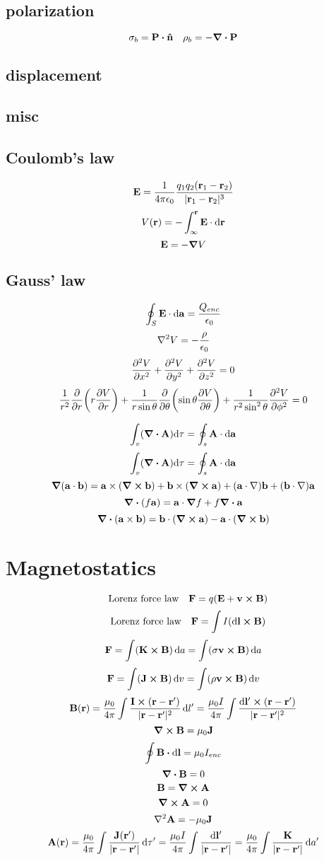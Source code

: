 \documentclass[12pt]{article}
\begin{document}
\subsection*{polarization}
\[\sigma_b=\vb{P}\vdot\vu{n}\quad\rho_b=-\div{\vb{P}}\]
\subsection*{displacement}
\subsection*{misc}

\subsection*{Coulomb's law}
\[\vb{E}=\frac{1}{4\pi\epsilon_0}\frac{q_1q_2(\vb{r}_1-\vb{r}_2)}{|\vb{r}_1-\vb{r}_2|^3}\]
\[V(\vb{r})=-\int_\infty^{\vb{r}}\vb{E}\cdot\dd\vb{r}\]
\[\vb{E}=-\grad{V}\]

\subsection*{Gauss' law}
\[\oint_S{\vb{E}\cdot\dd{\vb{a}}}=\frac{Q_{enc}}{\epsilon_0}\]
\[\laplacian{V}=-\frac{\rho}{\epsilon_0}\]
\[\pdv[2]{V}{x}+\pdv[2]{V}{y}+\pdv[2]{V}{z}=0\]
\[\frac{1}{r^2}\pdv{r}\qty(r\pdv{V}{r})+\frac{1}{r\sin\theta}\pdv{\theta}\qty(\sin\theta\pdv{V}{\theta})+\frac{1}{r^2\sin^2\theta}\pdv[2]{V}{\phi}=0\]

\[\int_{v}(\div{\vb{A}})\dd\tau=\oint_{s}\vb{A}\cdot\dd{\vb{a}}\]
\[\int_{v}(\div{\vb{A}})\dd\tau=\oint_{s}\vb{A}\cdot\dd{\vb{a}}\]
\[\grad{(\vb{a}\cdot\vb{b})}=\vb{a}\times(\curl{\vb{b}})+\vb{b}\times(\curl{\vb{a}})+(\vb{a}\cdot\nabla)\vb{b}+(\vb{b}\cdot\nabla)\vb{a}\]
\[\div{(f\vb{a})}=\vb{a}\cdot\grad{f}+f\div{\vb{a}}\]
\[\div{(\vb{a}\times\vb{b})}=\vb{b}\cdot(\curl{\vb{a}})-\vb{a}\cdot(\curl{\vb{b}})\]

\section{Magnetostatics}
\[\qq{Lorenz force law}\vb{F}=q(\vb{E}+\vb{v}\cp\vb{B})\]
\[\qq{Lorenz force law}\vb{F}=\int I(\dd\vb{l}\cp\vb{B})\]
\[\vb{F}=\int (\vb{K}\cp\vb{B})\dd{a}=\int (\sigma\vb{v}\cp\vb{B})\dd{a}\]
\[\vb{F}=\int (\vb{J}\cp\vb{B})\dd{v}=\int (\rho\vb{v}\cp\vb{B})\dd{v}\]
\[\vb{B}(\vb{r})=\frac{\mu_0}{4\pi}\int\frac{\vb{I}\cp(\vb{r}-\vb{r}')}{|\vb{r}-\vb{r}'|^2}\dd{l'}=\frac{\mu_0I}{4\pi}\int\frac{\dd\vb{l'}\cp(\vb{r}-\vb{r}')}{|\vb{r}-\vb{r}'|^2}\]
\[\curl{\vb{B}}=\mu_0\vb{J}\]
\[\oint\vb{B}\vdot\dd{\vb{l}}=\mu_0I_{enc}\]
\[\div{\vb{B}}=0\]
\[\vb{B}=\curl{\vb{A}}\]
\[\curl{\vb{A}}=0\]
\[\laplacian{\vb{A}}=-\mu_0\vb{J}\]
\[\vb{A(\vb{r})}=\frac{\mu_0}{4\pi}\int\frac{\vb{J(\vb{r'})}}{|\vb{r}-\vb{r'}|}\dd{\tau'}=\frac{\mu_0I}{4\pi}\int\frac{\dd{\vb{l}'}}{|\vb{r}-\vb{r'}|}=\frac{\mu_0}{4\pi}\int\frac{\vb{K}}{|\vb{r}-\vb{r'}|}\dd{a'}\]
\end{document}
